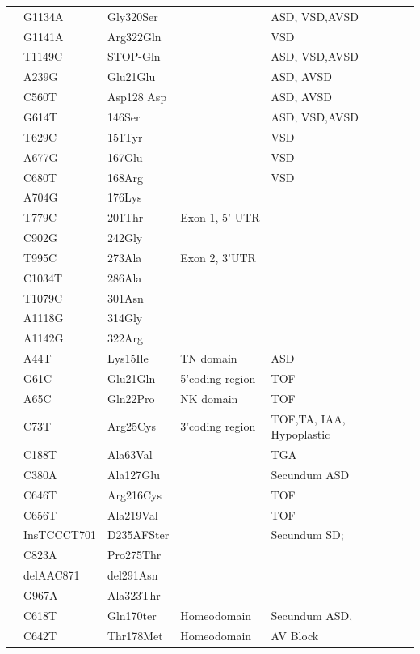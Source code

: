 \begin{refsection}
\begin{spacing}{1}
\begin{longtable}{P{0.75in} P{0.9in} P{0.85in} P{1.2in} p{1.3in}}
	 & G1134A & Gly320Ser &  & ASD, VSD,AVSD \\ 
	 & G1141A & Arg322Gln &  & VSD \\ 
	 & T1149C & STOP-Gln &  & ASD, VSD,AVSD \\ 
	 & A239G & Glu21Glu &  & ASD, AVSD \\ 
	 & C560T & Asp128 Asp &  & ASD, AVSD \\ 
	 & G614T & 146Ser &  & ASD, VSD,AVSD \\ 
	 & T629C & 151Tyr &  & VSD \\ 
	 & A677G & 167Glu &  & VSD \\ 
	 & C680T & 168Arg &  & VSD \\ 
	 & A704G & 176Lys &  &  \\ 
	 & T779C & 201Thr & Exon 1, 5’ UTR &  \\ 
	 & C902G & 242Gly &  &  \\ 
	 & T995C & 273Ala & Exon 2, 3’UTR &  \\ 
	 & C1034T & 286Ala &  &  \\ 
	 & T1079C & 301Asn &  &  \\ 
	 & A1118G & 314Gly &  &  \\ 
	 & A1142G & 322Arg &  &  \\ 
	  \midrule
	 & A44T & Lys15Ile & TN domain & ASD \\ 
	 & G61C & Glu21Gln & 5’coding region & TOF \\ 
	 & A65C & Gln22Pro & NK domain & TOF \\ 
	 & C73T & Arg25Cys & 3’coding region & TOF,TA, IAA, Hypoplastic \\ 
	 & C188T & Ala63Val &  & TGA \\ 
	 & C380A & Ala127Glu &  & Secundum ASD \\ 
	 & C646T & Arg216Cys &  & TOF \\ 
	 & C656T & Ala219Val &  & TOF \\ 
	 & InsTCCCT701 & D235AFSter &  & Secundum SD; \\ 
	 & C823A & Pro275Thr &  &  \\ 
	 & delAAC871 & del291Asn &  &  \\ 
	 & G967A & Ala323Thr &  &  \\ \midrule
	 & C618T & Gln170ter & Homeodomain & Secundum ASD, \\ 
	 & C642T & Thr178Met & Homeodomain & AV Block \\ 

\end{longtable}
\end{spacing}
\end{refsection}
